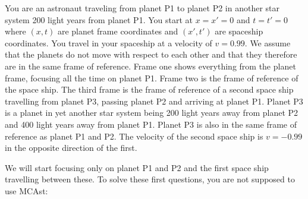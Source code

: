 {\begin{multicols}{2}
You are an astronaut traveling from planet P1 to planet P2 in another star system 200 light years from planet P1. You start at $x=x'=0$ and $t=t'=0$ where $(x,t)$ are planet frame coordinates and $(x',t')$ are spaceship coordinates. You travel in your spaceship at a velocity of $v=0.99$. We assume that the planets do not move with respect to each other and that they therefore are in the same frame of reference. Frame one shows everything from the planet frame, focusing all the time on planet P1. Frame two is the frame of reference of the space ship. The third frame is the frame of reference of a second space ship travelling from planet P3, passing planet P2 and arriving at planet P1. Planet P3 is a planet in yet another star system being 200 light years away from planet P2 and 400 light years away from planet P1. Planet P3 is also in the same frame of reference as planet P1 and P2. The velocity of the second space ship is $v=-0.99$ in the opposite direction of the first.

We will start focusing only on planet P1 and P2 and the first space ship travelling between these. To solve these first questions, you are not supposed to use MCAst:



\end{multicols}}
